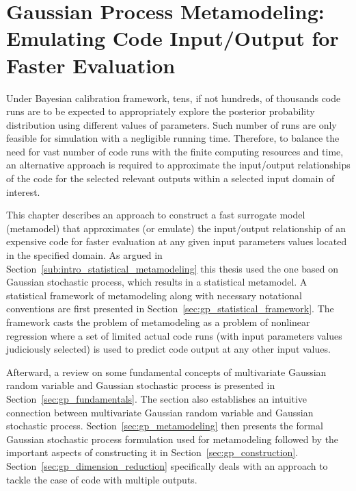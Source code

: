 \chapter[Gaussian Process Metamodeling]{Gaussian Process Metamodeling: Emulating Code Input/Output for Faster Evaluation}\label{ch:gp_metamodel}

Under Bayesian calibration framework, tens, if not hundreds, of thousands code runs are to be expected to appropriately explore the posterior probability distribution using different values of parameters.
Such number of runs are only feasible for simulation with a negligible running time.
Therefore, to balance the need for vast number of code runs with the finite computing resources and time, 
an alternative approach is required to approximate the input/output relationships of the code for the selected relevant outputs within a selected input domain of interest. 

This chapter describes an approach to construct a fast surrogate model (metamodel) that approximates (or emulate) the input/output relationship of an expensive code for faster evaluation at any given input parameters values located in the specified domain.
As argued in Section~\ref{sub:intro_statistical_metamodeling} this thesis used the one based on Gaussian stochastic process, which results in a statistical metamodel. 
A statistical framework of metamodeling along with necessary notational conventions are first presented in Section~\ref{sec:gp_statistical_framework}.
The framework casts the problem of metamodeling as a problem of nonlinear regression where a set of limited actual code runs (with input parameters values judiciously selected) is used to predict code output at any other input values.

Afterward, a review on some fundamental concepts of multivariate Gaussian random variable and Gaussian stochastic process is presented in Section~\ref{sec:gp_fundamentals}.
The section also establishes an intuitive connection between multivariate Gaussian random variable and Gaussian stochastic process.
Section~\ref{sec:gp_metamodeling} then presents the formal Gaussian stochastic process formulation used for metamodeling followed by the important aspects of constructing it in Section~\ref{sec:gp_construction}.
Section~\ref{sec:gp_dimension_reduction} specifically deals with an approach to tackle the case of code with multiple outputs.

